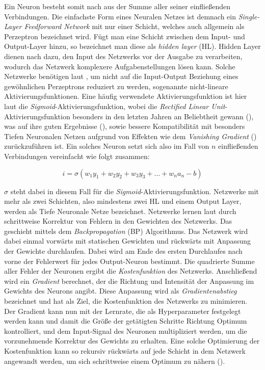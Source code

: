 Ein Neuron besteht somit nach \cite{haykin2007neural} aus der Summe aller seiner einfließenden Verbindungen. Die einfachste Form eines Neuralen Netzes ist demnach ein \textit{Single-Layer Feedforward Network} mit nur einer Schicht, welches auch allgemein als Perzeptron bezeichnet wird. Fügt man eine Schicht zwischen dem Input- und Output-Layer hinzu, so bezeichnet man diese als \textit{hidden layer} (HL). Hidden Layer dienen nach \cite{haykin2007neural} dazu, den Input des Netzwerks vor der Ausgabe zu verarbeiten, wodurch das Netzwerk komplexere Aufgabenstellungen lösen kann. Solche Netzwerke benötigen laut \cite{haykin2007neural}, um nicht auf die Input-Output Beziehung eines gewöhnlichen Perzeptrons reduziert zu werden, sogenannte nicht-lineare Aktivierungsfunktionen. Eine häufig verwendete Aktivierungsfunktion ist hier laut \cite{haykin2007neural} die \textit{Sigmoid}-Aktivierungsfunktion, wobei die \textit{Rectified Linear Unit}-Aktivierungsfunktion besonders in den letzten Jahren an Beliebtheit gewann (\cite{lecun2015deep}), was auf ihre guten Ergebnisse (\cite{nair2010rectified}), sowie bessere Kompatibilität mit besonders Tiefen Neuronalen Netzen aufgrund von Effekten wie dem \textit{Vanishing Gradient} (\cite{hochreiter2001gradient}) zurückzuführen ist. Ein solches Neuron setzt sich also im Fall von $n$ einfließenden Verbindungen vereinfacht wie folgt zusammen:

$$i=\sigma(w_1y_1+w_2y_2+w_3y_3+...+w_na_n - b)$$

$\sigma$ steht dabei in diesem Fall für die \textit{Sigmoid}-Aktivierungsfunktion. Netzwerke mit mehr als zwei Schichten, also mindestens zwei HL und einem Output Layer, werden als Tiefe Neuronale Netze bezeichnet. Netzwerke lernen laut \cite{haykin2007neural} durch schrittweise Korrektur von Fehlern in den Gewichten des Netzwerks. Das geschieht mittels dem \textit{Backpropagation} (BP) Algorithmus. Das Netzwerk wird dabei einmal vorwärts mit statischen Gewichten und rückwärts mit Anpassung der Gewichte durchlaufen. Dabei wird am Ende des ersten Durchlaufes nach vorne der Fehlerwert für jedes Output-Neuron bestimmt. Die quadrierte Summe aller Fehler der Neuronen ergibt die \textit{Kostenfunktion} des Netzwerks. Anschließend wird ein \textit{Gradient} berechnet, der die Richtung und Intensität der Anpassung im Gewichts des Neurons angibt. Diese Anpassung wird als \textit{Gradientenabstieg} bezeichnet und hat als Ziel, die Kostenfunktion des Netzwerks zu minimieren. Der Gradient kann nun mit der Lernrate, die als Hyperparameter festgelegt werden kann und damit die Größe der getätigten Schritte Richtung Optimum kontrolliert, und dem Input-Signal des Neuronen multipliziert werden, um die vorzunehmende Korrektur des Gewichts zu erhalten. Eine solche Optimierung der Kostenfunktion kann so rekursiv rückwärts auf jede Schicht in dem Netzwerk angewandt werden, um sich schrittweise einem Optimum zu nähern (\cite{haykin2007neural}).

